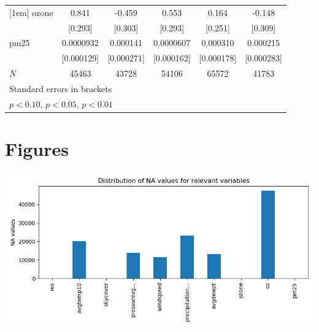 \documentclass[11pt]{article}
\begin{document}
\begin{subappendices}
\begin{center}
{{\begin{tabular}{l*{5}{c}}
						[1em]
						ozone       &       0.841\sym{***}&      -0.459         &       0.553\sym{*}  &       0.164         &      -0.148         \\
						&     [0.293]         &     [0.303]         &     [0.293]         &     [0.251]         &     [0.309]         \\
						[1em]
						pm25        &   0.0000932         &    0.000141         &   0.0000607         &    0.000310\sym{*}  &    0.000215         \\
						&  [0.000129]         &  [0.000271]         &  [0.000162]         &  [0.000178]         &  [0.000283]         \\
						\hline
						\(N\)       &       45463         &       43728         &       54106         &       65572         &       41783         \\
						\hline\hline
						\multicolumn{6}{l}{\footnotesize Standard errors in brackets}\\
						\multicolumn{6}{l}{\footnotesize \sym{*} \(p<0.10\), \sym{**} \(p<0.05\), \sym{***} \(p<0.01\)}\\
					\end{tabular}
				}
				
			}
		\end{center}
		
		\newpage
		\begin{center}
			 \label{tab:title} 
			{
			
			}
		\end{center}
		
	
	\newpage 
	\section{Figures}\label{BSec:xxxxx}	
		\begin{center}
		 \label{tab:title} 
		{
		\includegraphics[scale=0.85]{plot_na_dist_of_n_cols_with_most_na.png}		
		}
		\end{center}
	

\end{subappendices}
\end{document}
